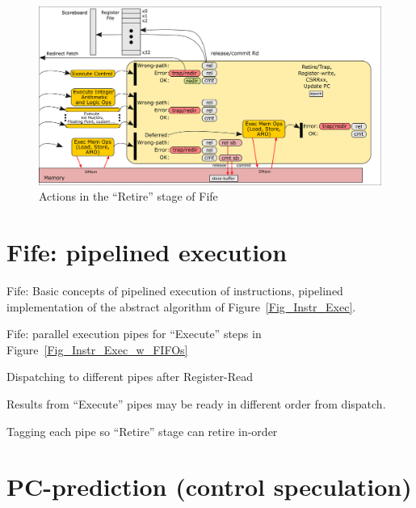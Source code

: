 \begin{figure}[htbp]
  \centerline{\includegraphics[width=6in,angle=0]{Figures/Fig_Fife_Retire}}
  \caption{\label{Fig_Fife_Retire}Actions in the ``Retire'' stage of Fife}
\end{figure}

\hdivider


\section{Fife: pipelined execution}

Fife: Basic concepts of pipelined execution of instructions, {\ie}
pipelined implementation of the abstract algorithm of
Figure~\ref{Fig_Instr_Exec}.

Fife: parallel execution pipes for ``Execute'' steps in
Figure~\ref{Fig_Instr_Exec_w_FIFOs}

\begin{tightlist}

  \item Dispatching to different pipes after Register-Read

  \item Results from ``Execute'' pipes may be ready in different order from dispatch.

  \item   Tagging each pipe so ``Retire'' stage can retire in-order
\end{tightlist}



\section{PC-prediction (control speculation)}

